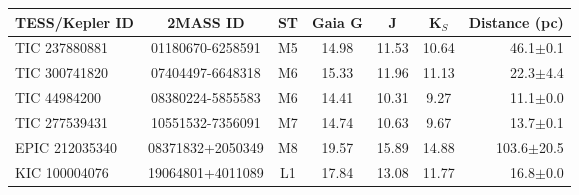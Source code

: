 \begin{tabular}{lcccccr}
\hline\hline
TESS/Kepler ID & 2MASS ID & ST & Gaia G & J & K$_S$ & Distance (pc) \\
\hline
TIC 237880881&01180670-6258591 & M5 & 14.98 & 11.53 & 10.64 & 46.1$\pm$0.1 \\
TIC 300741820&07404497-6648318 & M6 & 15.33 & 11.96 & 11.13 & 22.3$\pm$4.4 \\
TIC 44984200&08380224-5855583 & M6 & 14.41 & 10.31 & 9.27 & 11.1$\pm$0.0 \\
TIC 277539431&10551532-7356091 & M7 & 14.74 & 10.63 & 9.67 & 13.7$\pm$0.1 \\
EPIC 212035340&08371832+2050349 & M8 & 19.57 & 15.89 & 14.88 & 103.6$\pm$20.5 \\
KIC 100004076&19064801+4011089 & L1 & 17.84 & 13.08 & 11.77 & 16.8$\pm$0.0 \\
\hline
\end{tabular}

